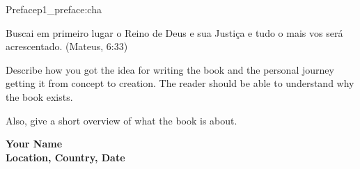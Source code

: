 


\begin{chapterpage}{Preface}{p1_preface:cha}

\begin{myquotation}
Buscai em primeiro lugar o Reino de Deus e sua Justiça e tudo o mais vos será acrescentado. (Mateus, 6:33)\end{myquotation}


\end{chapterpage}

Describe how you got the idea for writing the book and the personal journey getting it from concept to creation. The reader should be able to understand why the book exists.

Also, give a short overview of what the book is about.

\noindent \textbf{Your Name \\
Location, Country, Date\\}



\hfil{}\hfil





